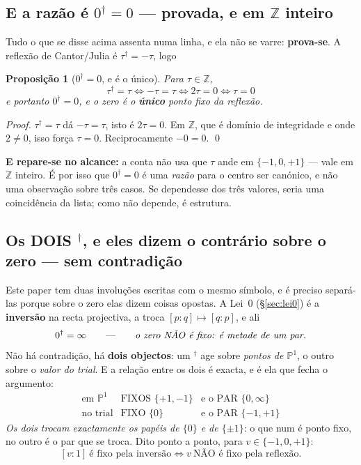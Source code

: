 \documentclass[11pt,a4paper]{article}
\newtheorem{proposicao}[teorema]{Proposição}
\newcommand{\dg}{^{\dagger}}
\begin{document}
\subsection*{E a razão é $0\dg=0$ --- provada, e em $\mathbb{Z}$ inteiro}

Tudo o que se disse acima assenta numa linha, e ela não se varre: \textbf{prova-se}. A
reflexão de Cantor/Julia é $\tau\dg=-\tau$, logo

\begin{proposicao}[$0\dg=0$, e é o único]\label{prop:zero-dual-zero}
Para $\tau\in\mathbb{Z}$,
\[
\boxed{\;\tau\dg=\tau\iff-\tau=\tau\iff2\tau=0\iff\tau=0\;}
\]
e portanto $0\dg=0$, e o zero é o \textbf{único} ponto fixo da reflexão.
\end{proposicao}

\begin{proof}
$\tau\dg=\tau$ dá $-\tau=\tau$, isto é $2\tau=0$. Em $\mathbb{Z}$, que é domínio de
integridade e onde $2\neq0$, isso força $\tau=0$. Reciprocamente $-0=0$. \qed
\end{proof}

\noindent\textbf{E repare-se no alcance:} a conta não usa que $\tau$ ande em
$\{-1,0,+1\}$ --- vale em $\mathbb{Z}$ inteiro. É por isso que $0\dg=0$ é uma
\emph{razão} para o centro ser canónico, e não uma observação sobre três casos. Se
dependesse dos três valores, seria uma coincidência da lista; como não depende, é
estrutura.

\subsection*{Os DOIS $\dg$, e eles dizem o contrário sobre o zero --- sem contradição}

Este paper tem duas involuções escritas com o mesmo símbolo, e é preciso separá-las porque
sobre o zero elas dizem coisas opostas. A Lei~0 (\S\ref{sec:lei0}) é a \textbf{inversão}
na recta projectiva, a troca $[p:q]\mapsto[q:p]$, e ali
\[
0\dg=\infty
\qquad\text{---}\qquad
\emph{o zero NÃO é fixo: é metade de um par.}
\]
Não há contradição, há \textbf{dois objectos}: um $\dg$ age sobre \emph{pontos de
$\mathbb{P}^1$}, o outro sobre o \emph{valor do trial}. E a relação entre os dois é exacta,
e é ela que fecha o argumento:
\[
\boxed{
\begin{array}{lll}
\text{em }\mathbb{P}^1 & \text{FIXOS }\{+1,-1\} & \text{e o PAR }\{0,\infty\}\\[2pt]
\text{no trial} & \text{FIXO }\{0\} & \text{e o PAR }\{-1,+1\}
\end{array}}
\]
\emph{Os dois trocam exactamente os papéis de $\{0\}$ e de $\{\pm1\}$}: o que num é ponto
fixo, no outro é o par que se troca. Dito ponto a ponto, para $v\in\{-1,0,+1\}$:
\[
[v:1]\ \text{é fixo pela inversão}
\iff
v\ \text{NÃO é fixo pela reflexão}.
\]
\end{document}
